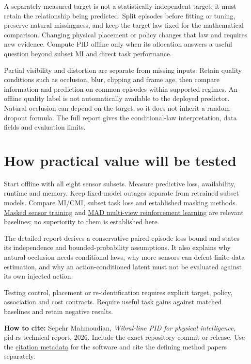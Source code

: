 \documentclass[11pt,a4paper]{article}
\begin{document}
A separately measured target is not a statistically independent target: it must retain the relationship being predicted. Split episodes before fitting or tuning, preserve natural missingness, and keep the target law fixed for the mathematical comparison. Changing physical placement or policy changes that law and requires new evidence. Compute PID offline only when its allocation answers a useful question beyond subset MI and direct task performance.

Partial visibility and distortion are separate from missing inputs. Retain quality conditions such as occlusion, blur, clipping and frame age, then compare information and prediction on common episodes within supported regimes. An offline quality label is not automatically available to the deployed predictor. Natural occlusion can depend on the target, so it does not inherit a random-dropout formula. The full report gives the conditional-law interpretation, data fields and evaluation limits.

\par{}

\section{How practical value will be tested}\label{how-practical-value-will-be-tested}

Start offline with all eight sensor subsets. Measure predictive loss, availability, runtime and memory. Keep fixed-model outages separate from retrained subset models. Compare MI/CMI, subset task loss and established masking methods. \href{https://proceedings.mlr.press/v270/skand25a.html}{Masked sensor training} and \href{https://proceedings.mlr.press/v305/almuzairee25a.html}{MAD multi-view reinforcement learning} are relevant baselines; no superiority to them is established here.

The detailed report derives a conservative paired-episode loss bound and states its independence and bounded-probability assumptions. It also explains why natural occlusion needs conditional laws, why more sensors can defeat finite-data estimation, and why an action-conditioned latent must not be evaluated against its own injected action.

Testing control, placement or re-identification requires explicit target, policy, association and cost contracts. Require useful task gains against matched baselines and retain negative results.

\textbf{How to cite:} Sepehr Mahmoudian, \emph{Wibral-line PID for physical intelligence}, pid-rs technical report, 2026. Include the exact repository commit or release. Use the \href{https://github.com/sepahead/pid-rs/blob/main/CITATION.cff}{citation metadata} for the software and cite the defining method papers separately.
\end{document}
